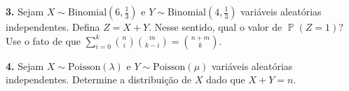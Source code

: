 \documentclass[12pt]{article}
\DeclareMathOperator{\PX}{\mathbb{P}} %
\begin{document}
\newpage

\noindent\textbf{3.} Sejam $X\sim\text{Binomial}\left(6, \frac{1}{3}\right)$ e $Y\sim\text{Binomial}\left(4, \frac{1}{3}\right)$ variáveis aleatórias independentes. Defina $Z = X + Y$. Nesse sentido, qual o valor de $\PX(Z = 1)$? Use o fato de que $\sum_{i = 0}^{k}{n \choose i}{m \choose {k - i}} = {{n + m} \choose k}$.

\newpage

\noindent\textbf{4.} Sejam $X\sim\text{Poisson}(\lambda)$ e $Y\sim\text{Poisson}(\mu)$ variáveis aleatórias independentes. Determine a distribuição de $X$ dado que $X + Y = n$.
\end{document}
